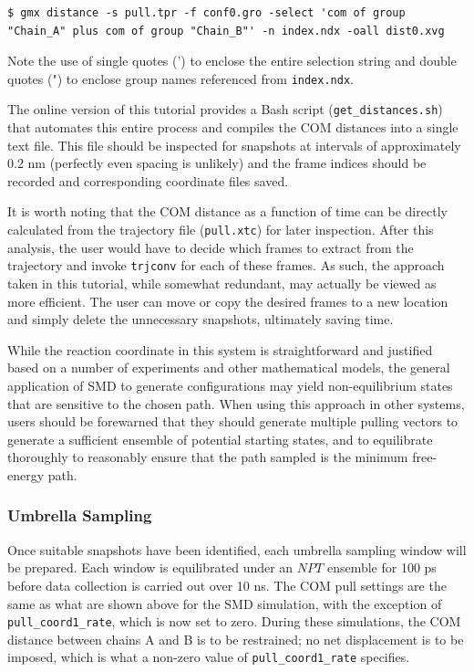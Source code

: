 \documentclass[9pt,tutorial,pubversion]{livecoms}
\begin{document}
\begin{lstlisting}
$ gmx distance -s pull.tpr -f conf0.gro -select 'com of group "Chain_A" plus com of group "Chain_B"' -n index.ndx -oall dist0.xvg
\end{lstlisting}
%
Note the use of single quotes (') to enclose the entire selection string and double quotes (") to enclose group names referenced from \texttt{index.ndx}.

The online version of this tutorial provides a Bash script (\texttt{get\_distances.sh}) that automates this entire process and compiles the COM distances into a single text file. This file should be inspected for snapshots at intervals of approximately 0.2 nm (perfectly even spacing is unlikely) and the frame indices should be recorded and corresponding coordinate files saved.

It is worth noting that the COM distance as a function of time can be directly calculated from the trajectory file (\texttt{pull.xtc}) for later inspection. After this analysis, the user would have to decide which frames to extract from the trajectory and invoke \texttt{trjconv} for each of these frames. As such, the approach taken in this tutorial, while somewhat redundant, may actually be viewed as more efficient. The user can move or copy the desired frames to a new location and simply delete the unnecessary snapshots, ultimately saving time.

While the reaction coordinate in this system is straightforward and justified based on a number of experiments and other mathematical models, the general application of SMD to generate configurations may yield non-equilibrium states that are sensitive to the chosen path. When using this approach in other systems, users should be forewarned that they should generate multiple pulling vectors to generate a sufficient ensemble of potential starting states, and to equilibrate thoroughly to reasonably ensure that the path sampled is the minimum free-energy path.

\subsubsection{Umbrella Sampling} \label{umbrella_us}

Once suitable snapshots have been identified, each umbrella sampling window will be prepared. Each window is equilibrated under an $NPT$ ensemble for 100 ps before data collection is carried out over 10 ns. The COM pull settings are the same as what are shown above for the SMD simulation, with the exception of \texttt{pull\_coord1\_rate}, which is now set to zero. During these simulations, the COM distance between chains A and B is to be restrained; no net displacement is to be imposed, which is what a non-zero value of \texttt{pull\_coord1\_rate} specifies.
\end{document}
